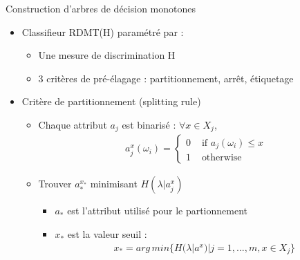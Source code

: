 \documentclass[usenames,dvipsnames]{beamer}
\newcommand{\beamcite}[1]{\hfill {\footnotesize \textcite{#1}}}
\begin{document}
\begin{frame}{Construction d'arbres de décision monotones \beamcite{marsala-rank}}
    \begin{itemize}
        \item Classifieur RDMT(H) paramétré par : 
            \begin{itemize}
                \item Une mesure de discrimination H
                \item 3 critères de pré-élagage : partitionnement, arrêt, étiquetage
            \end{itemize}
        \item Critère de partitionnement (splitting rule)
            \begin{itemize}
                \item Chaque attribut $a_j$ est binarisé : $\forall x \in X_j$,
                    \begin{equation*}
                    \begin{array}{cl}
                        a^x_j(\omega_i) = \begin{cases}{0} &\text{ if } a_j(\omega_i) \leq x\\
                          {1} &\text{ otherwise}\end{cases}
                     \end{array}
                     \end{equation*}
                \item Trouver $a^{x_*}_*$ minimisant $H(\lambda|a^x_j)$
                    \begin{itemize}
                        \item $a_*$ est l'attribut utilisé pour le partionnement
                        \item $x_*$ est la valeur seuil : 
                            \begin{equation*}
                            \begin{array}{cl}
                                x_* = arg\,min \{H(\lambda|a^x) | j=1,...,m, x \in X_j\}
                            \end{array}
                            \end{equation*}
                    \end{itemize}
            \end{itemize}
    \end{itemize}
\end{frame}
\end{document}
